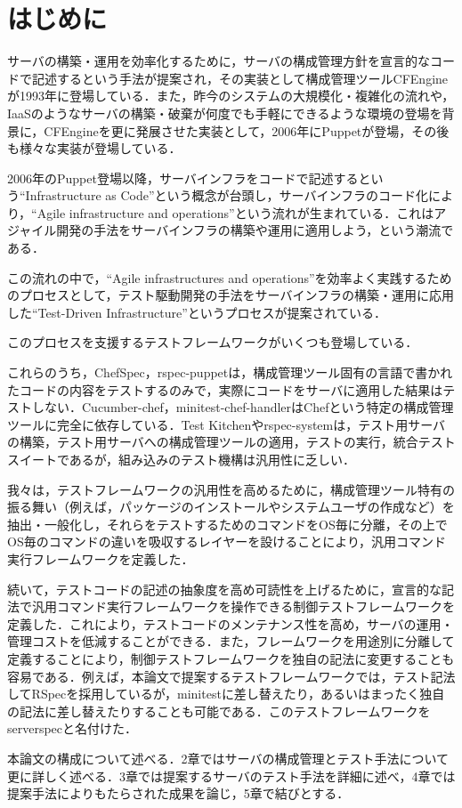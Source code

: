 \section{はじめに}

サーバの構築・運用を効率化するために，サーバの構成管理方針を宣言的なコードで記述するという手法が提案され，その実装として構成管理ツールCFEngine\cite{cfengine}が1993年に登場している．また，昨今のシステムの大規模化・複雑化の流れや，IaaSのようなサーバの構築・破棄が何度でも手軽にできるような環境の登場を背景に，CFEngineを更に発展させた実装として，2006年にPuppet\cite{puppet}が登場，その後も様々な実装が登場している\cite{chef}\cite{saltstack}\cite{ansible}．

2006年のPuppet登場以降，サーバインフラをコードで記述するという``Infrastructure as Code''という概念が台頭し，サーバインフラのコード化により，``Agile infrastructure and operations''\cite{agile infrastructure}という流れが生まれている．これはアジャイル開発の手法をサーバインフラの構築や運用に適用しよう，という潮流である．

この流れの中で，``Agile infrastructures and operations''を効率よく実践するためのプロセスとして，テスト駆動開発の手法をサーバインフラの構築・運用に応用した``Test-Driven Infrastructure''\cite{test driven infrastructure with chef}というプロセスが提案されている．

このプロセスを支援するテストフレームワークがいくつも登場している\cite{chefspec}\cite{rspec-puppet}\cite{cucumber-chef}\cite{minitest-chef-handler}\cite{test kitchen}\cite{rspec-system}．

これらのうち，ChefSpec，rspec-puppetは，構成管理ツール固有の言語で書かれたコードの内容をテストするのみで，実際にコードをサーバに適用した結果はテストしない．Cucumber-chef，minitest-chef-handlerはChefという特定の構成管理ツールに完全に依存している．Test Kitchenやrspec-systemは，テスト用サーバの構築，テスト用サーバへの構成管理ツールの適用，テストの実行，統合テストスイートであるが，組み込みのテスト機構は汎用性に乏しい．

我々は，テストフレームワークの汎用性を高めるために，構成管理ツール特有の振る舞い（例えば，パッケージのインストールやシステムユーザの作成など）を抽出・一般化し，それらをテストするためのコマンドをOS毎に分離，その上でOS毎のコマンドの違いを吸収するレイヤーを設けることにより，汎用コマンド実行フレームワークを定義した．

続いて，テストコードの記述の抽象度を高め可読性を上げるために，宣言的な記法で汎用コマンド実行フレームワークを操作できる制御テストフレームワークを定義した．これにより，テストコードのメンテナンス性を高め，サーバの運用・管理コストを低減することができる．また，フレームワークを用途別に分離して定義することにより，制御テストフレームワークを独自の記法に変更することも容易である．例えば，本論文で提案するテストフレームワークでは，テスト記法してRSpec\cite{rspec}を採用しているが，minitest\cite{minitest}に差し替えたり，あるいはまったく独自の記法に差し替えたりすることも可能である．このテストフレームワークをserverspec\cite{serverspec}と名付けた．

本論文の構成について述べる．2章ではサーバの構成管理とテスト手法について更に詳しく述べる．3章では提案するサーバのテスト手法を詳細に述べ，4章では提案手法によりもたらされた成果を論じ，5章で結びとする．
